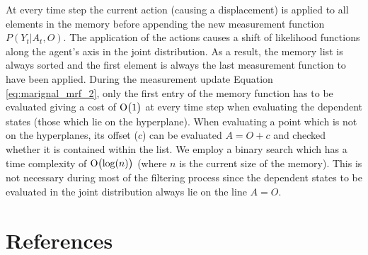 \documentclass[review]{elsarticle}
\numberwithin{equation}{section}
\begin{document}
At every time step the current action (causing a displacement) is applied to all elements in the memory before appending the new 
measurement function $P(Y_t|A_t,O)$. The application of the actions causes a shift of likelihood functions along the agent's axis
in the joint distribution. As a result, the memory list is always sorted and the first element is always the last measurement function
to have been applied. 
During the measurement update Equation \ref{eq:marignal_mrf_2}, only the first entry of the memory function has to be evaluated
giving a cost of $\operatorname{O}\bigl(1\bigr)$ at every time step when evaluating the dependent states (those which lie on the hyperplane). When
evaluating a point which is not on the hyperplanes, its offset ($c$) can be evaluated $A=O+c$ and checked whether it is contained
within the list. We employ a binary search which has a time complexity of $\operatorname{O}\bigl(\log(n)\bigr)$ (where $n$ is the current size of the memory). This is not necessary during most
of the filtering process since the dependent states to be evaluated in the joint distribution always lie on the line $A=O$.

\section*{References}


\end{document}
